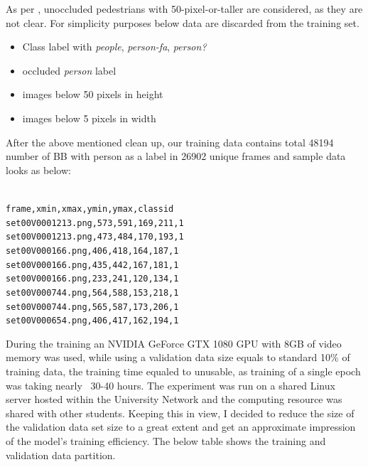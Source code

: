 
As per \cite{walk2010new}, unoccluded pedestrians with 50-pixel-or-taller are considered, as they are not clear. For simplicity purposes below data are discarded from the training set.
\begin{itemize}
	\item Class label with \textit{people}, \textit{person-fa}, \textit{person?}
	\item occluded \textit{person} label
	\item images below 50 pixels in height
	\item images below 5 pixels in width
\end{itemize}

After the above mentioned clean up, our training data contains total 48194 number of BB with person as a label in 26902 unique frames and sample data looks as below:
\begin{center}
\texttt{  \\
frame,xmin,xmax,ymin,ymax,class\textunderscore id \\
set00\textunderscore V000\textunderscore 1213.png,573,591,169,211,1 \\
set00\textunderscore V000\textunderscore 1213.png,473,484,170,193,1 \\
set00\textunderscore V000\textunderscore 166.png,406,418,164,187,1 \\
set00\textunderscore V000\textunderscore 166.png,435,442,167,181,1 \\
set00\textunderscore V000\textunderscore 166.png,233,241,120,134,1 \\
set00\textunderscore V000\textunderscore 744.png,564,588,153,218,1 \\
set00\textunderscore V000\textunderscore 744.png,565,587,173,206,1 \\
set00\textunderscore V000\textunderscore 654.png,406,417,162,194,1 \\
}
\end{center}

During the training an NVIDIA GeForce GTX 1080 GPU with 8GB of video memory was used, while using a validation data size equals to standard 10\% of training data, the training time equaled to unusable, as training of a single epoch was taking nearly ~30-40 hours. The experiment was run on a shared Linux server hosted within the University Network and the computing resource was shared with other students. Keeping this in view, I decided to reduce the size of the validation data set size to a great extent and get an approximate impression of the model's training efficiency. The below table shows the training and validation data partition.

